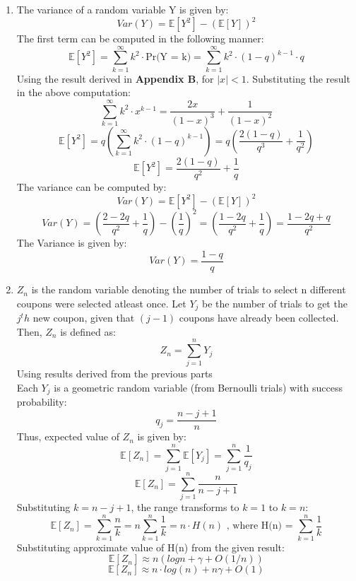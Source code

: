 \documentclass{article}
\begin{document}
\begin{enumerate}
\begin{enumerate}
    \item The variance of a random variable Y is given by:
    \[
        Var(Y) = \mathbb{E}[Y^2] - (\mathbb{E}[Y])^2
    \]
    The first term can be computed in the following manner:
    \[
        \mathbb{E}[Y^2] = \sum_{k=1}^{\infty} k^2 \cdot \text{Pr(Y = k)} = \sum_{k=1}^{\infty} k^2 \cdot (1-q)^{k-1}\cdot q
    \]
    Using the result derived in \textbf{Appendix B}, for $|x| < 1$. Substituting the result in the above computation:
    \[
        \sum_{k=1}^{\infty} k^2 \cdot x^{k-1} = \frac{2x}{(1-x)^3} + \frac{1}{(1-x)^2}
    \]
    \[
        \mathbb{E}[Y^2] = q \left( \sum_{k=1}^{\infty} k^2 \cdot (1-q)^{k-1} \right) = q \left( \frac{2(1-q)}{q^3} + \frac{1}{q^2}\right)
    \]
    \[
        \mathbb{E}[Y^2] = \frac{2(1-q)}{q^2} + \frac{1}{q}
    \]
    The variance can be computed by:
    \[
        Var(Y) = \mathbb{E}[Y^2] - (\mathbb{E}[Y])^2
    \]
    \[
        Var(Y) = \left( \frac{2-2q}{q^2} + \frac{1}{q} \right) - \left(\frac{1}{q}\right)^2 = \left( \frac{1-2q}{q^2} + \frac{1}{q} \right) = \frac{1-2q+q}{q^2}
    \]
    The Variance is given by:
    \[
        \boxed{Var(Y) = \frac{1-q}{q}}
    \]
    
    \item $Z_n$ is the random variable denoting the number of trials to select n different coupons were selected atleast once. Let $Y_j$ be the number of trials to get the $j^th$ new coupon, given that $(j-1)$ coupons have already been collected. Then, $Z_n$ is defined as:
    \[
        Z_n = \sum_{j = 1}^{n} Y_j
    \]
    Using results derived from the previous parts\\
    Each $Y_j$ is a geometric random variable (from Bernoulli trials) with success probability:
    \[
        q_j = \frac{n-j+1}{n}
    \]
    Thus, expected value of $Z_n$ is given by:
    \[
        \mathbb{E}[Z_n] = \sum_{j=1}^{n}\mathbb{E}[Y_j] = \sum_{j=1}^{n}\frac{1}{q_j}
    \]
    \[
        \mathbb{E}[Z_n] = \sum_{j=1}^{n}\frac{n}{n-j+1}
    \]
    Substituting $k=n-j+1$, the range transforms to $k=1$ to $k=n$:
    \[
        \mathbb{E}[Z_n] = \sum_{k=1}^{n}\frac{n}{k} = n\sum_{k=1}^{n}\frac{1}{k} = n \cdot H(n) \text{ , where H(n) = $\sum_{k=1}^n\frac{1}{k}$}
    \]
    Substituting approximate value of H(n) from the given result:
    \[
        \mathbb{E}[Z_n] \approx n \left( log n + \gamma + O(1/n)\right)
    \]
    \[
        \boxed{\mathbb{E}[Z_n] \approx n \cdot log(n) + n\gamma + O(1)}
    \]


\end{enumerate}
\end{enumerate}
\end{document}
